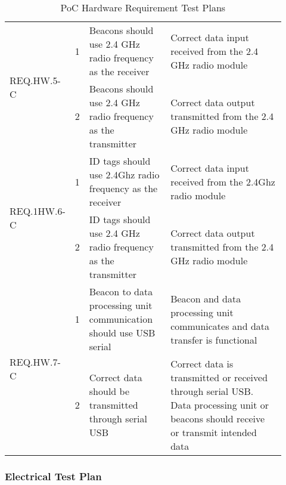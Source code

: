 \begin{table}[h!]
\begin{tabular}{|m{0.15\linewidth}|m{0.02\linewidth}|m{0.3\linewidth}|m{0.45\linewidth}|}
    \multirow{2}{*}{REQ.HW.5-C} 
    & 1 
    & Beacons should use 2.4 GHz radio frequency as the receiver     
    & Correct data input received from the 2.4 GHz radio module          \\ 
    \cline{2-4}
    & 2 
    & Beacons should use 2.4 GHz radio frequency as the transmitter     
    & Correct data output transmitted from the 2.4 GHz radio module   \\
    \hline
    
    \multirow{2}{*}{REQ.1HW.6-C} 
    & 1 
    & ID tags should use 2.4Ghz radio frequency as the receiver     
    & Correct data input received from the 2.4Ghz radio module          \\ 
    \cline{2-4}
    & 2 
    & ID tags should use 2.4 GHz radio frequency as the transmitter     
    & Correct data output transmitted from the 2.4 GHz radio module   \\
    \hline
    
    \multirow{2}{*}{REQ.HW.7-C} 
    & 1 
    & Beacon to data processing unit communication should use USB serial
    & Beacon and data processing unit communicates and data transfer is functional         \\ 
    \cline{2-4}
    & 2 
    & Correct data should be transmitted through serial USB     
    & Correct data is transmitted or received through serial USB. Data processing unit or beacons should receive or transmit
    intended data   \\
    \hline    

\end{tabular}
    \caption{PoC Hardware Requirement Test Plans}
\end{table}



\break
\subsubsection{Electrical Test Plan}

